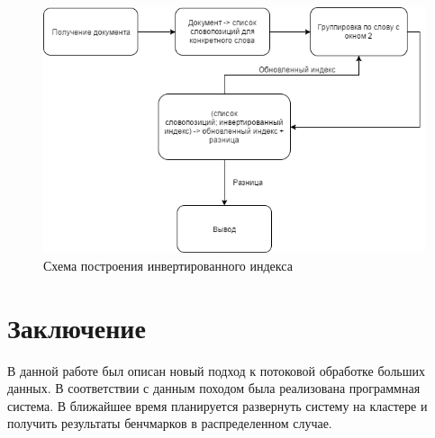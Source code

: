 \documentclass[14pt]{matmex-diploma-custom}
\begin{document}
\begin{figure}[h]
\centering
\includegraphics[width=\textwidth,height=\textheight,keepaspectratio]{pics/II.png}
\caption{Схема построения инвертированного индекса}
\end{figure}


\section*{Заключение}

В данной работе был описан новый подход к потоковой обработке больших данных. В соответствии с данным походом была реализована программная система. В ближайшее время планируется развернуть систему на кластере и получить результаты бенчмарков в распределенном случае.

\setmonofont[Mapping=tex-text]{CMU Typewriter Text}


\end{document}
